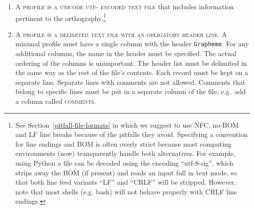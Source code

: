 \begin{enumerate}
	\def\labelenumi{A\arabic{enumi}.} 
	\item \textsc{A profile is a unicode utf-\scalebox{0.8}{8} encoded text file} 
       that includes information pertinent to the orthography.\footnote{See 
	   Section~\ref{pitfall-file-formats} in which we suggest to use NFC, 
	   no-BOM and LF line breaks because of the pitfalls they avoid. Specifying 
	   a convention for line endings and BOM is often overly strict because most 
	   computing environments (now) transparently handle both alternatives. 
	   For example, using Python a file can be decoded using the encoding 
	   ``utf-8-sig'', which strips away the BOM (if present) and reads 
	   an input full in text mode, so that both line feed variants ``LF'' and 
	   ``CRLF'' will be stripped. However, note that most shells (e.g. bash) will not 
	   behave properly with CRLF line endings.}

	\item \textsc{A profile is a delimited text file with an obligatory header
       line}. A minimal profile must have a single column with the header \texttt{Grapheme}. 
	   For any additional columns, the name in the header 
       must be specified. The actual ordering of the columns is unimportant. 
	   The header list must be delimited 
	   in the same way as the rest of the file's contents. Each record must be kept 
	   on a separate line. Separate lines with comments are not allowed. Comments that
       belong to specific lines must be put in a separate column of
       the file, e.g.~add a column called \textsc{comments}.

\begin{comment}	   
	\item \textsc{Metadata should be added in a separate utf-\scalebox{0.8}{8} text file} using a basic
       \textsc{tag: value} format. Metadata about the orthographic description
       given in the orthography profile includes, minimally, (i) author, (ii)
       date, (iii) title of the profile, (iv) a stable language identifier
       encoded in BCP 47/ISO 639-3 of the target language of the profile, and (v)
       bibliographic data for resource(s) that illustrate the orthography
       described in the profile. Further, (vi) the tokenization method and (vii)
       the Unicode normalization used should be documented here (see below).
\end{comment}


\end{enumerate}
